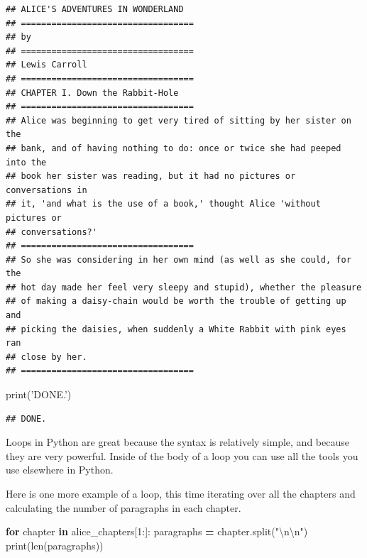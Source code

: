 \documentclass[]{book}
\newenvironment{Shaded}{\begin{snugshade}}{\end{snugshade}}
\newcommand{\BuiltInTok}[1]{#1}
\newcommand{\CharTok}[1]{\textcolor[rgb]{0.31,0.60,0.02}{#1}}
\newcommand{\ControlFlowTok}[1]{\textcolor[rgb]{0.13,0.29,0.53}{\textbf{#1}}}
\newcommand{\DecValTok}[1]{\textcolor[rgb]{0.00,0.00,0.81}{#1}}
\newcommand{\KeywordTok}[1]{\textcolor[rgb]{0.13,0.29,0.53}{\textbf{#1}}}
\newcommand{\NormalTok}[1]{#1}
\newcommand{\OperatorTok}[1]{\textcolor[rgb]{0.81,0.36,0.00}{\textbf{#1}}}
\newcommand{\StringTok}[1]{\textcolor[rgb]{0.31,0.60,0.02}{#1}}
\begin{document}
\begin{verbatim}
## ﻿ALICE'S ADVENTURES IN WONDERLAND
## ==================================
## by
## ==================================
## Lewis Carroll
## ==================================
## CHAPTER I. Down the Rabbit-Hole
## ==================================
## Alice was beginning to get very tired of sitting by her sister on the
## bank, and of having nothing to do: once or twice she had peeped into the
## book her sister was reading, but it had no pictures or conversations in
## it, 'and what is the use of a book,' thought Alice 'without pictures or
## conversations?'
## ==================================
## So she was considering in her own mind (as well as she could, for the
## hot day made her feel very sleepy and stupid), whether the pleasure
## of making a daisy-chain would be worth the trouble of getting up and
## picking the daisies, when suddenly a White Rabbit with pink eyes ran
## close by her.
## ==================================
\end{verbatim}

\begin{Shaded}
\begin{Highlighting}[]
\BuiltInTok{print}\NormalTok{(}\StringTok{'DONE.'}\NormalTok{)}
\end{Highlighting}
\end{Shaded}

\begin{verbatim}
## DONE.
\end{verbatim}

Loops in Python are great because the syntax is relatively simple, and because they are very powerful. Inside of the body of a loop you can use all the tools you use elsewhere in Python.

Here is one more example of a loop, this time iterating over all the chapters and calculating the number of paragraphs in each chapter.

\begin{Shaded}
\begin{Highlighting}[]
\ControlFlowTok{for}\NormalTok{ chapter }\KeywordTok{in}\NormalTok{ alice_chapters[}\DecValTok{1}\NormalTok{:]:}
\NormalTok{    paragraphs }\OperatorTok{=}\NormalTok{ chapter.split(}\StringTok{"}\CharTok{\textbackslash{}n\textbackslash{}n}\StringTok{"}\NormalTok{)}
    \BuiltInTok{print}\NormalTok{(}\BuiltInTok{len}\NormalTok{(paragraphs))}
\end{Highlighting}
\end{Shaded}
\end{document}
